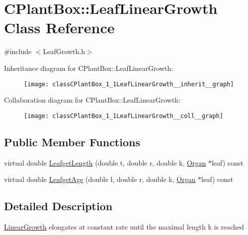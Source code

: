 \hypertarget{classCPlantBox_1_1LeafLinearGrowth}{}\section{C\+Plant\+Box\+:\+:Leaf\+Linear\+Growth Class Reference}
\label{classCPlantBox_1_1LeafLinearGrowth}


{\ttfamily \#include $<$Leaf\+Growth.\+h$>$}



Inheritance diagram for C\+Plant\+Box\+:\+:Leaf\+Linear\+Growth\+:\nopagebreak
\begin{figure}[H]
\begin{center}
\leavevmode
\texttt{[image: classCPlantBox\_1\_1LeafLinearGrowth\_\_inherit\_\_graph]}
\end{center}
\end{figure}


Collaboration diagram for C\+Plant\+Box\+:\+:Leaf\+Linear\+Growth\+:\nopagebreak
\begin{figure}[H]
\begin{center}
\leavevmode
\texttt{[image: classCPlantBox\_1\_1LeafLinearGrowth\_\_coll\_\_graph]}
\end{center}
\end{figure}
\subsection*{Public Member Functions}
\begin{DoxyCompactItemize}
\item 
virtual double \hyperlink{classCPlantBox_1_1LeafLinearGrowth_a46f07fae546309d050777f1b5350ecf0}{Leafget\+Length} (double t, double r, double k, \hyperlink{classCPlantBox_1_1Organ}{Organ} $\ast$leaf) const
\item 
virtual double \hyperlink{classCPlantBox_1_1LeafLinearGrowth_ab66497e86721f7ba08d89ab3a78582d9}{Leafget\+Age} (double l, double r, double k, \hyperlink{classCPlantBox_1_1Organ}{Organ} $\ast$leaf) const
\end{DoxyCompactItemize}


\subsection{Detailed Description}
\hyperlink{classCPlantBox_1_1LinearGrowth}{Linear\+Growth} elongates at constant rate until the maximal length k is reached 

